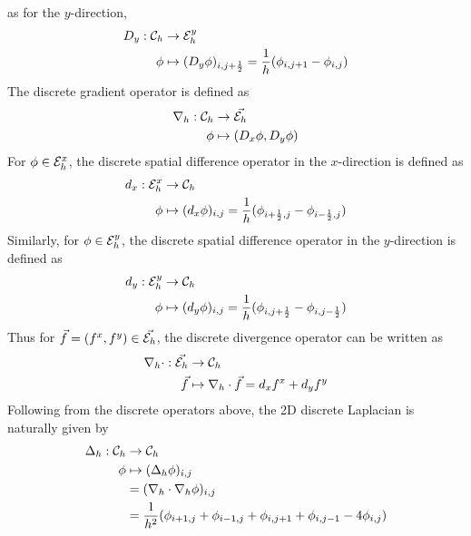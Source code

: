 as for the $y$-direction,\begin{equation}
    \begin{aligned}
        D_y:{\mathcal{C}_h}&\rightarrow{\mathcal{E}^y_h}\\
        \phi&\mapsto(D_y \phi)_{i,j+\frac{1}{2}}=\frac{1}{h}(\phi_{i,j+1}-\phi_{i,j})
    \end{aligned}
\end{equation}
The discrete gradient operator is defined as
\begin{equation}
    \begin{aligned}\nabla_h:{\mathcal{C}_h}&\rightarrow{\vec{\mathcal{E}_h}}\\
    \phi&\mapsto(D_x\phi,D_y\phi)
    \end{aligned}
\end{equation}
For $\phi \in {\mathcal{E}^x_h}$, the discrete spatial difference operator in the $x$-direction is defined as
\begin{equation}
    \begin{aligned}
        d_x:{\mathcal{E}^x_h}&\rightarrow{\mathcal{C}_h}\\
        \phi&\mapsto(d_x\phi)_{i,j}=\frac{1}{h}(\phi_{i+\frac{1}{2},j}-\phi_{i-\frac{1}{2},j})
    \end{aligned}
\end{equation}
Similarly, for $\phi \in {\mathcal{E}^y_h}$, the discrete spatial difference operator in the $y$-direction is defined as
\begin{equation}
    \begin{aligned}
        d_y:{\mathcal{E}^y_h}&\rightarrow{\mathcal{C}_h}\\
        \phi&\mapsto(d_y\phi)_{i,j}=\frac{1}{h}(\phi_{i,j+\frac{1}{2}}-\phi_{i,j-\frac{1}{2}})
    \end{aligned}
\end{equation}
Thus for $\vec{f}=(f^x,f^y)\in{\vec{\mathcal{E}_h}}$, the discrete divergence operator can be written as\begin{equation}
    \begin{aligned}
        \nabla_h\cdot:{\vec{\mathcal{E}_h}}&\rightarrow{\mathcal{C}_h}\\
        \vec{f}&\mapsto\nabla_h\cdot \vec{f}=d_xf^x+d_yf^y
    \end{aligned}
\end{equation}
Following from the discrete operators above, the 2D discrete Laplacian is naturally given by
\begin{equation}
    \begin{aligned}
        \Delta_h:{\mathcal{C}_h}&\rightarrow{\mathcal{C}_h}\\
        \phi&\mapsto (\Delta_h \phi)_{i,j}\\
        &=(\nabla_h\cdot \nabla_h \phi)_{i,j}\\
        &=\frac{1}{h^2}(\phi_{i+1,j}+\phi_{i-1,j}+\phi_{i,j+1}+\phi_{i,j-1}-4\phi_{i,j})
    \end{aligned}
\end{equation}
